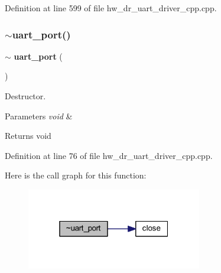 Definition at line 599 of file hw\+\_\+dr\+\_\+uart\+\_\+driver\+\_\+cpp.\+cpp.

\mbox{\label{group___u_a_r_t_gae7fba3439edc5cb87b5280887027fa65}} 
\subsubsection{$\sim$uart\_port()}
{\footnotesize\ttfamily $\sim$\textbf{ uart\+\_\+port} (\begin{DoxyParamCaption}\item[{void}]{ }\end{DoxyParamCaption})}



Destructor. 


\begin{DoxyParams}{Parameters}
{\em void} & \\
\hline
\end{DoxyParams}
\begin{DoxyReturn}{Returns}
void 
\end{DoxyReturn}


Definition at line 76 of file hw\+\_\+dr\+\_\+uart\+\_\+driver\+\_\+cpp.\+cpp.

Here is the call graph for this function\+:\nopagebreak
\begin{figure}[H]
\begin{center}
\leavevmode
\includegraphics[width=217pt]{group___u_a_r_t_gae7fba3439edc5cb87b5280887027fa65_cgraph}
\end{center}
\end{figure}
